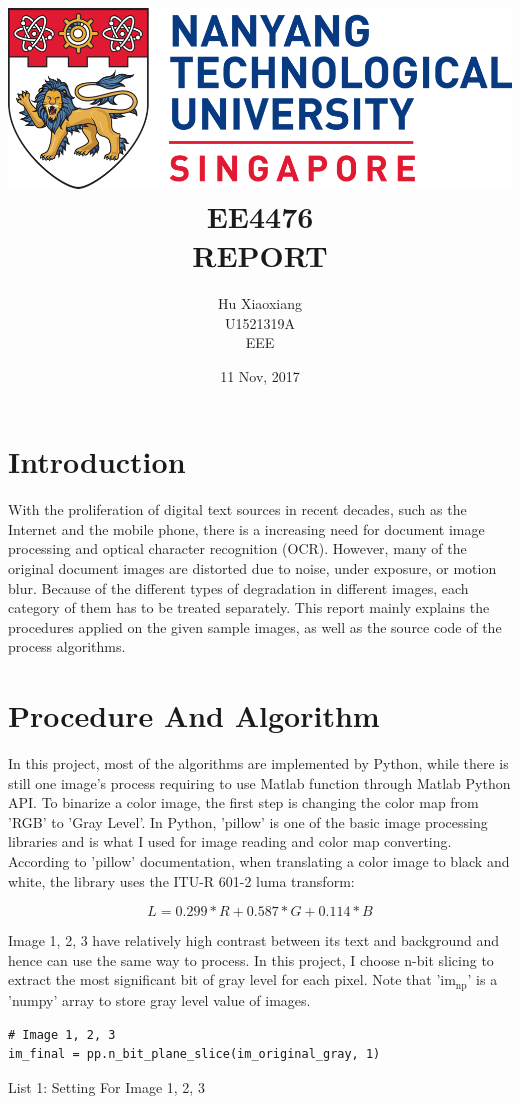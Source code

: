 \documentclass[titlepage]{article}
\author{Hu Xiaoxiang \\
U1521319A \\
EEE \\
}
\date{11 Nov, 2017 \\
}
\title{\includegraphics[width=\textwidth]{logo_ntu_new.png} \\
[5\baselineskip] EE4476 \\
REPORT \\
[5\baselineskip]}
\begin{document}
\maketitle
\tableofcontents

\newpage
{}

\section{Introduction}
\label{sec:orgb0c446c}
With the proliferation of digital text sources in recent decades, such as the
Internet and the mobile phone, there is a increasing need for document image
processing and optical character recognition (OCR). However, many of the
original document images are distorted due to noise, under exposure, or motion
blur. Because of the different types of degradation in different images, each
category of them has to be treated separately. This report mainly explains the
procedures applied on the given sample images, as well as the source code of
the process algorithms.

\section{Procedure And Algorithm}
\label{sec:orgec8d273}
In this project, most of the algorithms are implemented by Python, while there
is still one image's process requiring to use Matlab function through Matlab
Python API. To binarize a color image, the first step is changing the color
map from 'RGB' to 'Gray Level'. In Python, 'pillow' is one of the basic image
processing libraries and is what I used for image reading and color map
converting. According to 'pillow' documentation, when translating a color image
to black and white, the library uses the ITU-R 601-2 luma transform: 

$$ L = 0.299 * R + 0.587 * G + 0.114 * B $$

Image 1, 2, 3 have relatively high contrast between its text and background
and hence can use the same way to process. In this project, I choose n-bit
slicing to extract the most significant bit of gray level for each pixel. Note
that 'im\(_{\text{np}}\)' is a 'numpy' array to store gray level value of images.

\begin{listing}
\begin{verbatim}
# Image 1, 2, 3
im_final = pp.n_bit_plane_slice(im_original_gray, 1)
\end{verbatim}
\centering
\caption{List 1: Setting For Image 1, 2, 3}
\newline
\end{listing}
\end{document}
